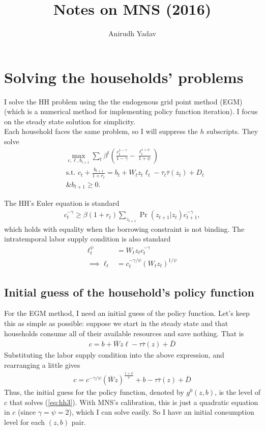 \documentclass[12pt]{article}
\title{Notes on MNS (2016)}
\author{Anirudh Yadav}
\begin{document}
\maketitle


\section{Solving the households' problems}
I solve the HH problem using the the endogenous grid point method (EGM) (which is a numerical method for implementing policy function iteration). I focus on the steady state solution for simplicity.\\

Each household faces the same problem, so I will suppress the $h$ subscripts. They solve
\begin{align*}
&\max_{c,\ell, b_{t+1}} \sum_t \beta^t \left(\frac{c_t^{1-\gamma}}{1-\gamma} - \frac{\ell_t^{1+\psi}}{1+\psi}\right)\\
&\text{s.t. } c_t + \frac{b_{t+1}}{1+r_t} = b_t + W_tz_t\ell_t - \tau_t\bar\tau(z_t) +D_t\\
&\text{\& } b_{t+1} \geq 0.
\end{align*}

The HH's Euler equation is standard
\begin{align}
c_t^{-\gamma} \geq \beta(1+r_t) \sum_{z_{t+1}}\Pr(z_{t+1}|z_t)c_{t+1}^{-\gamma},  \label{eq:hh1}
\end{align}
which holds with equality when the borrowing constraint is not binding. The intratemporal labor supply condition is also standard
\begin{align}
\ell_t^\psi &= W_tz_tc_t^{-\gamma} \label{eq:hh2}\\
\implies  \ell_t&=c_t^{-\gamma/\psi}(W_tz_t)^{1/\psi}
\end{align}

\subsection{Initial guess of the household's policy function}
For the EGM method, I need an initial guess of the policy function. Let's keep this as simple as possible: suppose we start in the steady state and that households consume all of their available resources and save nothing. That is
\begin{align*}
c =  b + \bar Wz\ell - \tau\bar\tau(z) +\bar D
\end{align*}
Substituting the labor supply condition into the above expression, and rearranging a little gives
\begin{align}
c = c^{-\gamma/\psi}(\bar Wz)^{\frac{1+\psi}{\psi}}+ b - \tau\bar\tau(z) +\bar D \label{eq:hh3}
\end{align}
Thus, the initial guess for the policy function, denoted by $g^0(z,b)$, is the level of $c$ that solves (\ref{eq:hh3}). With MNS's calibration, this is just a quadratic equation in $c$ (since $\gamma=\psi=2$), which I can solve easily. So I have an initial consumption level for each $(z,b)$ pair.
\end{document}
